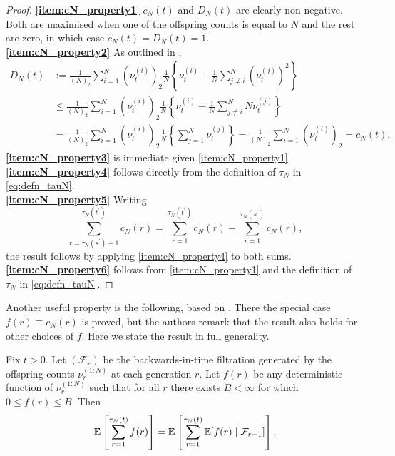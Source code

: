 \begin{proof}
\textbf{\ref{item:cN_property1}}  $c_N(t)$ and $D_N(t)$ are clearly non-negative. Both are maximised when one of the offspring counts is equal to $N$ and the rest are zero, in which case $c_N(t) = D_N(t) = 1$.\\
\textbf{\ref{item:cN_property2}} As outlined in \textcite[p.9]{koskela2018},
\begin{align*}
D_N(t) &:= \frac{1}{(N)_2} \sum_{i=1}^N (\nu_t^{(i)})_2 \frac{1}{N} \left\{  \nu_t^{(i)} + \frac{1}{N} \sum_{j\neq i}^N (\nu_t^{(j)})^2 \right\} \\
&\leq \frac{1}{(N)_2} \sum_{i=1}^N (\nu_t^{(i)})_2 \frac{1}{N} \left\{  \nu_t^{(i)} + \frac{1}{N} \sum_{j\neq i}^N N \nu_t^{(j)} \right\} \\
&= \frac{1}{(N)_2} \sum_{i=1}^N (\nu_t^{(i)})_2 \frac{1}{N} \left\{ \sum_{j =1}^N \nu_t^{(j)} \right\}
= \frac{1}{(N)_2} \sum_{i=1}^N (\nu_t^{(i)})_2
= c_N(t) .
\end{align*}
\textbf{\ref{item:cN_property3}} is immediate given \ref{item:cN_property1}.\\
\textbf{\ref{item:cN_property4}} follows directly from the definition of $\tau_N$ in \eqref{eq:defn_tauN}.\\
\textbf{\ref{item:cN_property5}} Writing
\begin{equation*}
\sum_{r=\tau_N(s^\prime)+1}^{\tau_N(t^\prime)} c_N(r)
= \sum_{r=1}^{\tau_N(t^\prime)} c_N(r) 
        - \sum_{r=1}^{\tau_N(s^\prime)} c_N(r) ,
\end{equation*}
the result follows by applying \ref{item:cN_property4} to both sums.\\
\textbf{\ref{item:cN_property6}} follows from \ref{item:cN_property1} and the definition of $\tau_N$ in \eqref{eq:defn_tauN}.
\end{proof}


Another useful property is the following, based on \textcite[Lemma 2]{koskela2018}. There the special case $f(r) \equiv c_N(r)$ is proved, but the authors remark that the result also holds for other choices of $f$. Here we state the result in full generality.

\begin{lemma}\label{thm:kjjslemma2}
Fix $t>0$.
Let $(\mathcal{F}_r)$ be the backwards-in-time filtration generated by the offspring counts $\nu_r^{(1:N)}$ at each generation $r$.
Let $f(r)$ be any deterministic function of $\nu_r^{(1:N)}$ such that for all $r$ there exists $B<\infty$ for which $0\leq f(r) \leq B$.
Then
\begin{equation*}
\mathbb{E} \left[ \sum_{r=1}^{\tau_N(t)} f(r) \right] 
= \mathbb{E} \left[ \sum_{r=1}^{\tau_N(t)} \mathbb{E} [ f(r) \mid \mathcal{F}_{r-1} ] \right] .
\end{equation*}
\end{lemma}

